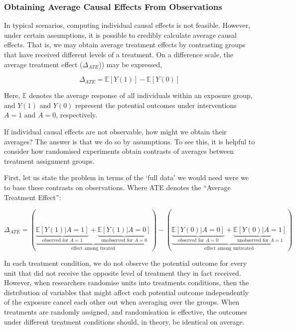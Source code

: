 \documentclass[
  singlecolumn,
  9pt]{article}
\begin{document}
\subsubsection{Obtaining Average Causal Effects From
Observations}\label{obtaining-average-causal-effects-from-observations}

In typical scenarios, computing individual causal effects is not
feasible. However, under certain assumptions, it is possible to credibly
calculate average causal effects. That is, we may obtain average
treatment effects by contrasting groups that have received different
levels of a treatment. On a difference scale, the average treatment
effect (\(\Delta_{ATE}\))) may be expressed,

\[
\Delta_{ATE}  = \mathbb{E}[Y(1)] - \mathbb{E}[Y(0)]
\]

Here, \(\mathbb{E}\) denotes the average response of all individuals
within an exposure group, and \(Y(1)\) and \(Y(0)\) represent the
potential outcomes under interventions \(A = 1\) and \(A = 0\),
respectively.

If individual causal effects are not observable, how might we obtain
their averages? The answer is that we do so by assumptions. To see this,
it is helpful to consider how randomised experiments obtain contrasts of
averages between treatment assignment groups.

First, let us state the problem in terms of the `full data' we would
need were we to base these contrasts on observations. Where ATE denotes
the ``Average Treatment Effect'':

\[
\Delta_{ATE} = \left(\underbrace{\underbrace{\mathbb{E}[Y(1)|A = 1]}_{\text{observed for } A = 1} + \underbrace{\mathbb{E}[Y(1)|A = 0]}_{\text{unobserved for } A = 0}}_{\text{effect among treated}}\right) - \left(\underbrace{\underbrace{\mathbb{E}[Y(0)|A = 0]}_{\text{observed for } A = 0} + \underbrace{\mathbb{E}[Y(0)|A = 1]}_{\text{unobserved for } A = 1}}_{\text{effect among untreated}}\right)
\]

In each treatment condition, we do not observe the potential outcome for
every unit that did not receive the opposite level of treatment they in
fact received. However, when researchers randomise units into treatments
conditions, then the distribution of variables that might affect each
potential outcome independently of the exposure cancel each other out
when averaging over the groups. When treatments are randomly assigned,
and randomisation is effective, the outcomes under different treatment
conditions should, in theory, be identical on average.
\end{document}

